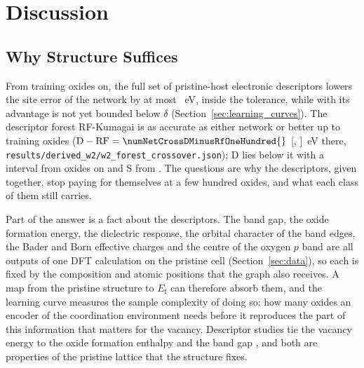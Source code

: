 \section{Discussion}
\label{sec:discussion}

\subsection{Why Structure Suffices}
\label{sec:disc_principal}

From \numNetNStar{} training oxides on, the full set of pristine-host electronic descriptors lowers the site error of the network by at most \numNetHeadlineAUpper{}~eV, inside the tolerance, while with \numCfgBudgetsHostsItemFive{} its advantage is not yet bounded below $\delta$ (Section~\ref{sec:learning_curves}). The descriptor forest RF-Kumagai is as accurate as either network or better up to \numCfgBudgetsHostsItemThree{} training oxides ($\mathrm{D} - \mathrm{RF} = \numNetCrossDMinusRfOneHundred{}$ [\numNetCrossDMinusRfOneHundredLo{}, \numNetCrossDMinusRfOneHundredHi{}]~eV there, \texttt{results/derived\_w2/w2\_forest\_crossover.json}); D lies below it with a \pctci{} interval from \numNetCrossDBudget{} oxides on and S from \numNetCrossSBudget{}. %
The questions are why the descriptors, given together, stop paying for themselves at a few hundred oxides, and what each class of them still carries.

Part of the answer is a fact about the descriptors. The band gap, the oxide formation energy, the dielectric response, the orbital character of the band edges, the Bader and Born effective charges and the centre of the oxygen $p$ band are all outputs of one DFT calculation on the pristine cell (Section~\ref{sec:data}), so each is fixed by the composition and atomic positions that the graph also receives. A map from the pristine structure to $E_\mathrm{f}$ can therefore absorb them, and the learning curve measures the sample complexity of doing so: how many oxides an encoder of the coordination environment needs before it reproduces the part of this information that matters for the vacancy. Descriptor studies tie the vacancy energy to the oxide formation enthalpy and the band gap \citep{Deml2014oxide,Deml2015intrinsic,Wexler2021factors}, and both are properties of the pristine lattice that the structure fixes.

